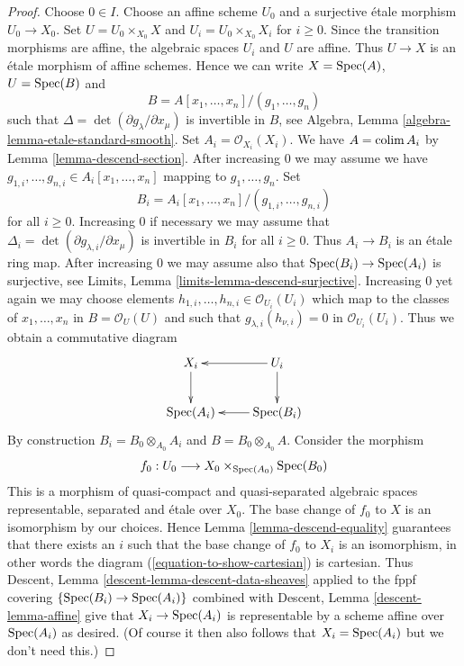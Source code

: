 \begin{proof}
Choose $0 \in I$. Choose an affine scheme $U_0$ and a surjective
\'etale morphism $U_0 \to X_0$. Set $U = U_0 \times_{X_0} X$
and $U_i = U_0 \times_{X_0} X_i$ for $i \geq 0$. Since the transition
morphisms are affine, the algebraic spaces $U_i$ and $U$ are affine.
Thus $U \to X$ is an \'etale morphism of affine schemes. Hence we
can write $X = \mathop{\mathrm{Spec}}(A)$, $U = \mathop{\mathrm{Spec}}(B)$ and
$$
B = A[x_1, \ldots, x_n]/(g_1, \ldots, g_n)
$$
such that $\Delta = \det(\partial g_\lambda/\partial x_\mu)$ is invertible
in $B$, see Algebra, Lemma \ref{algebra-lemma-etale-standard-smooth}.
Set $A_i = \mathcal{O}_{X_i}(X_i)$. We have $A = \mathop{\mathrm{colim}}\nolimits A_i$ by
Lemma \ref{lemma-descend-section}. After increasing $0$ we may assume
we have $g_{1, i}, \ldots, g_{n, i} \in A_i[x_1, \ldots, x_n]$ mapping to
$g_1, \ldots, g_n$. Set
$$
B_i = A_i[x_1, \ldots, x_n]/(g_{1, i}, \ldots, g_{n, i})
$$
for all $i \geq 0$. Increasing $0$ if necessary we may assume that
$\Delta_i = \det(\partial g_{\lambda, i}/\partial x_\mu)$ is invertible
in $B_i$ for all $i \geq 0$. Thus $A_i \to B_i$ is an \'etale ring map.
After increasing $0$ we may assume also that
$\mathop{\mathrm{Spec}}(B_i) \to \mathop{\mathrm{Spec}}(A_i)$ is surjective, see
Limits, Lemma \ref{limits-lemma-descend-surjective}. Increasing
$0$ yet again we may choose elements
$h_{1, i}, \ldots, h_{n, i} \in \mathcal{O}_{U_i}(U_i)$ which map to the
classes of $x_1, \ldots, x_n$ in $B = \mathcal{O}_U(U)$ and such that
$g_{\lambda, i}(h_{\nu, i}) = 0$ in $\mathcal{O}_{U_i}(U_i)$. Thus
we obtain a commutative diagram
\begin{equation}
\label{equation-to-show-cartesian}
\vcenter{
\xymatrix{
X_i \ar[d] & U_i \ar[l] \ar[d] \\
\Spec(A_i) & \Spec(B_i) \ar[l]
}
}
\end{equation}
By construction $B_i = B_0 \otimes_{A_0} A_i$ and
$B = B_0 \otimes_{A_0} A$. Consider the morphism
$$
f_0 : U_0 \longrightarrow X_0 \times_{\mathop{\mathrm{Spec}}(A_0)} \mathop{\mathrm{Spec}}(B_0)
$$
This is a morphism of quasi-compact and quasi-separated algebraic spaces
representable, separated and \'etale over $X_0$. The base change of $f_0$
to $X$ is an isomorphism by our choices. Hence
Lemma \ref{lemma-descend-equality}
guarantees that there exists an $i$ such that the base change of $f_0$
to $X_i$ is an isomorphism, in other words the diagram
(\ref{equation-to-show-cartesian}) is cartesian. Thus
Descent, Lemma \ref{descent-lemma-descent-data-sheaves}
applied to the fppf covering $\{\mathop{\mathrm{Spec}}(B_i) \to \mathop{\mathrm{Spec}}(A_i)\}$
combined with Descent, Lemma \ref{descent-lemma-affine}
give that $X_i \to \mathop{\mathrm{Spec}}(A_i)$ is representable by a scheme
affine over $\mathop{\mathrm{Spec}}(A_i)$ as desired. (Of course it then also follows
that $X_i = \mathop{\mathrm{Spec}}(A_i)$ but we don't need this.)
\end{proof}

